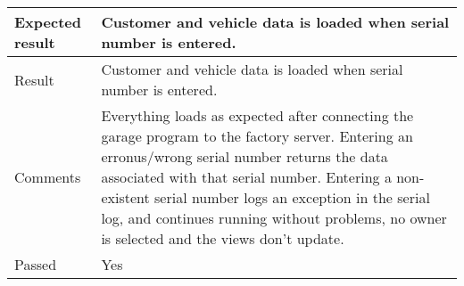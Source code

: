 \begin{table}[H]
\begin{tabularx}{1.0\textwidth}{
    |p{}     %
    |p{}|    %
}
Expected result
& Customer and vehicle data is loaded when serial number is entered.
\\
\hline

Result
& Customer and vehicle data is loaded when serial number is entered.
\\
\hline

Comments
& Everything loads as expected after connecting the garage program to the factory server. Entering an erronus/wrong serial number returns the data associated with that serial number. Entering a non-existent serial number logs an exception in the serial log, and continues running without problems, no owner is selected and the views don't update.
\\
\hline

Passed
& Yes
\\
\hline

\end{tabularx}
\end{table}


